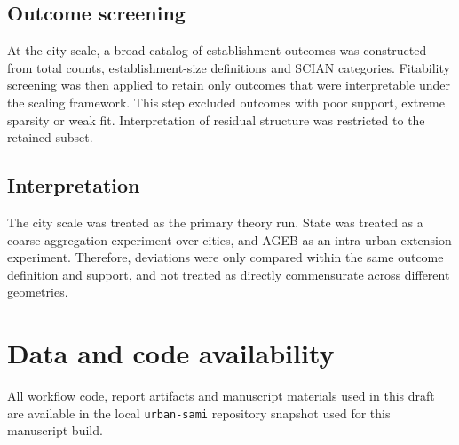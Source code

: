 \documentclass[11pt]{article}
\begin{document}
\subsection*{Outcome screening}
At the city scale, a broad catalog of establishment outcomes was constructed from total counts, establishment-size definitions and SCIAN categories. Fitability screening was then applied to retain only outcomes that were interpretable under the scaling framework. This step excluded outcomes with poor support, extreme sparsity or weak fit. Interpretation of residual structure was restricted to the retained subset.

\subsection*{Interpretation}
The city scale was treated as the primary theory run. State was treated as a coarse aggregation experiment over cities, and AGEB as an intra-urban extension experiment. Therefore, deviations were only compared within the same outcome definition and support, and not treated as directly commensurate across different geometries.

\section*{Data and code availability}
All workflow code, report artifacts and manuscript materials used in this draft are available in the local \texttt{urban-sami} repository snapshot used for this manuscript build.



\end{document}
